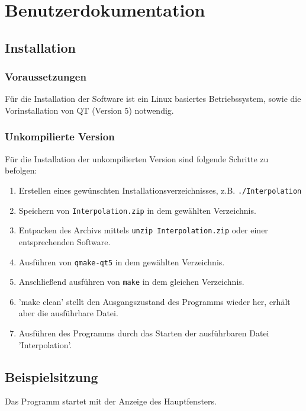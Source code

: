 \chapter{Benutzerdokumentation}
\label{ch:4}

\section{Installation}
\subsection{Voraussetzungen}
F\"ur die Installation der Software ist ein Linux basiertes Betriebssystem, sowie die Vorinstallation von QT (Version 5) notwendig.

\subsection{Unkompilierte Version}
F\"ur die Installation der unkompilierten Version sind folgende Schritte zu befolgen:
\begin{enumerate}
  \item Erstellen eines gew\"unschten Installationsverzeichnisses, z.B. \verb+./Interpolation+
  \item Speichern von \verb+Interpolation.zip+ in dem gew\"ahlten Verzeichnis.
  \item Entpacken des Archivs mittels \verb+unzip Interpolation.zip+ oder einer entsprechenden Software.
  \item Ausf\"uhren von \verb+qmake-qt5+ in dem gew\"ahlten Verzeichnis.
  \item Anschlie\ss end ausf\"uhren von \verb+make+ in dem gleichen Verzeichnis.
  \item 'make clean' stellt den Ausgangszustand des Programms wieder her, erh\"alt aber die ausf\"uhrbare Datei.
  \item Ausf\"uhren des Programms durch das Starten der ausf\"uhrbaren Datei 'Interpolation'.
\end{enumerate}

\section{Beispielsitzung}
Das Programm startet mit der Anzeige des Hauptfensters.\\

